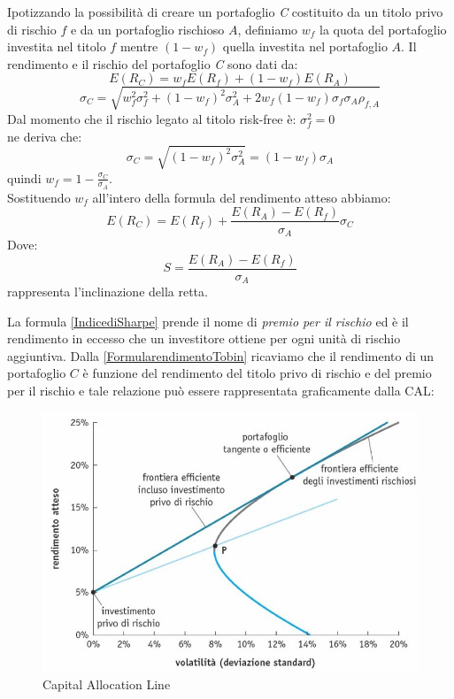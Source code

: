 Ipotizzando la possibilità di creare un portafoglio \textit{C} costituito da un titolo privo di rischio $f$ e da un portafoglio rischioso $A$, definiamo $w_f$ la quota del portafoglio investita nel titolo $f$ mentre $(1-w_f)$ quella investita nel portafoglio $A$. Il rendimento e il rischio del portafoglio \textit{C} sono dati da:
\begin{equation}
E(R_C)= w_f E(R_{f})+(1-w_f) E(R_{A})
\end{equation}
\begin{equation}
\sigma_{C}=\sqrt{w_f^2\sigma^2_{f}+(1-w_f)^2\sigma^2_{A}+ 2w_f(1-w_f)\sigma_{f}\sigma_{A}\rho_{f,A}} 
\end{equation}
Dal momento che il rischio legato al titolo risk-free è: $\sigma^2_{f}=0$ \\
ne deriva che:
\begin{equation}
\sigma_{C}=\sqrt{(1-w_f)^2\sigma^2_{A}}=(1-w_f)\sigma_{A}
\nonumber
\end{equation} 
quindi $w_f=1- \frac{\sigma_{C}}{\sigma_{A}}.$\\

Sostituendo $w_f$ all'intero della formula del rendimento atteso abbiamo: 
\begin{equation}
\label{FormularendimentoTobin}
E(R_{C})= E(R_{f})+\frac{E(R_{A})-E(R_{f})}{\sigma_{A}}\sigma_{C}
\end{equation}
Dove: 
\begin{equation}
\label{IndicediSharpe}
S=\frac{E(R_{A})-E(R_{f})}{\sigma_{A}}
\end{equation}
rappresenta l'inclinazione della retta. 

La formula \ref{IndicediSharpe} prende il nome di \textit{premio per il rischio} ed è il rendimento in eccesso che un investitore ottiene per ogni unità di rischio aggiuntiva. Dalla \ref{FormularendimentoTobin} ricaviamo che il rendimento di un portafoglio $C$ è funzione del rendimento del titolo privo di rischio e del premio per il rischio e tale relazione può essere rappresentata graficamente dalla CAL:
\begin{figure} [h!]
	\centering
	\includegraphics[width=0.5\linewidth]{"imgs/Figura+Il+portafoglio+tangente+o+efficiente (2)"}
	\caption{ Capital Allocation Line \cite{berk_finanza_2012}}
	\label{fig:figurailportafogliotangenteoefficiente-2}
\end{figure}

